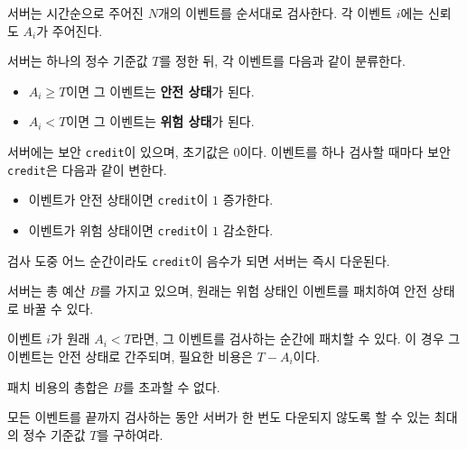 서버는 시간순으로 주어진 $N$개의 이벤트를 순서대로 검사한다.
각 이벤트 $i$에는 신뢰도 $A_i$가 주어진다.

서버는 하나의 정수 기준값 $T$를 정한 뒤, 각 이벤트를 다음과 같이 분류한다.

\begin{itemize}
    \item $A_i \ge T$이면 그 이벤트는 \textbf{안전 상태}가 된다.
    \item $A_i < T$이면 그 이벤트는 \textbf{위험 상태}가 된다.
\end{itemize}

서버에는 보안 \texttt{credit}이 있으며, 초기값은 $0$이다.
이벤트를 하나 검사할 때마다 보안 \texttt{credit}은 다음과 같이 변한다.

\begin{itemize}
    \item 이벤트가 안전 상태이면 \texttt{credit}이 $1$ 증가한다.
    \item 이벤트가 위험 상태이면 \texttt{credit}이 $1$ 감소한다.
\end{itemize}

검사 도중 어느 순간이라도 \texttt{credit}이 음수가 되면 서버는 즉시 다운된다.

서버는 총 예산 $B$를 가지고 있으며, 원래는 위험 상태인 이벤트를 패치하여 안전 상태로 바꿀 수 있다.

이벤트 $i$가 원래 $A_i < T$라면, 그 이벤트를 검사하는 순간에 패치할 수 있다.
이 경우 그 이벤트는 안전 상태로 간주되며, 필요한 비용은 $T - A_i$이다.

패치 비용의 총합은 $B$를 초과할 수 없다.

모든 이벤트를 끝까지 검사하는 동안 서버가 한 번도 다운되지 않도록 할 수 있는 최대의 정수 기준값 $T$를 구하여라.